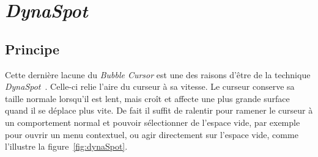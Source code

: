 \section{\emph{DynaSpot}}
	\subsection{Principe}
	Cette dernière lacune du \emph{Bubble Cursor} est une des raisons d'être de la technique \emph{DynaSpot}~\cite{chapuis2009dynaspot}. Celle-ci relie l'aire du curseur à sa vitesse. Le curseur conserve sa taille normale lorsqu'il est lent, mais croît et affecte une plus grande surface quand il se déplace plus vite. De fait il suffit de ralentir pour ramener le curseur à un comportement \og normal \fg{} et pouvoir sélectionner de l'espace vide, par exemple pour ouvrir un menu contextuel, ou agir directement sur l'espace vide, comme l'illustre la figure~\ref{fig:dynaSpot}.
	
